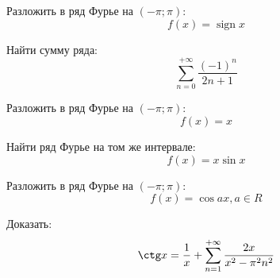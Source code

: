 \documentclass[russian]{article}
\newcommand{\sign}{\mathop{\mathrm{sign}}}
\begin{document}
 Разложить в ряд Фурье на $(-\pi; \pi)$:
 $$f(x) = \sign x$$
 
 Найти сумму ряда:
 $$\sum\limits_{n = 0}^{+\infty} \frac{(-1)^n}{2n + 1}$$
 
 Разложить в ряд Фурье на $(-\pi; \pi)$:
 $$f(x) = x$$
 
 Найти ряд Фурье на том же интервале:
 $$f(x) = x \sin x$$
 
 Разложить в ряд Фурье на $(-\pi; \pi)$:
 $$f(x) = \cos ax, a \in R$$
 
 Доказать:
 $$\ctg x = \frac{1}{x} + \sum\limits_{n = 1}^{+\infty} \frac{2x}{x^2 - \pi^2n^2}$$
 
 
\end{document}

